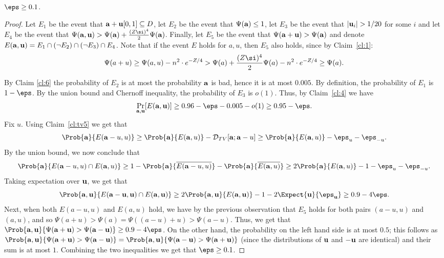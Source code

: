 \begin{claim}
	\label{cl:5}
	$\eps\geq 0.1$.
\end{claim}
\begin{proof}
	Let $E_1$ be the event that ${\bf a} + {\bf u}[0,1]\subseteq D$, let
    $E_2$ be the event that $\Psi({\bf a})\leq 1$, let $E_3$ be the event
	that $|{\bf u}_i|>1/20$ for some $i$ and let $E_4$ be the event that
	$\Psi({\bf a},{\bf u})>\Psi({\bf a})+\frac{(Z\si)^4}{2}\Psi({\bf a})$. Finally, let $E_5$ be the event that
	$\Psi({\bf a}+{\bf u})>\Psi({\bf a})$ and denote $E({\bf a},{\bf u}) = E_1\cap (\neg E_2)\cap (\neg E_3)\cap E_4$.
    Note that if the event $E$ holds for $a,u$, then $E_5$ also holds, since by Claim~\ref{cl:1}:
	\[
	\Psi(a+u)\geq \Psi(a,u)-n^2\cdot e^{-Z/4}> \Psi(a)+\frac{(Z\si)^4}{2}\Psi(a)-n^2\cdot e^{-Z/4}\geq \Psi(a).
	\]



    By Claim \ref{cl:6} the probability of $E_2$ is at most the probability ${\bf a}$ is bad, hence it is at most $0.005$.
    By definition, the probability of $E_1$ is $1-\eps$.
    By the union bound and Chernoff inequality, the probability of $E_3$ is $o(1)$.
	Thus, by Claim~\ref{cl:4} we have
	\begin{equation}
	\Pr_{{\bf a},{\bf u}}[E({\bf a},{\bf u})]\geq 0.96 -\eps- 0.005 - o(1)\geq 0.95-\eps.
	\end{equation}
    Fix $u$. Using Claim~\ref{cl:tv5} we get that
    \[
    \Prob{{\bf a}}{E({\bf a}-u,u)} \geq
    \Prob{{\bf a}}{E({\bf a},u)} - \mathcal{D}_{TV}[{\bf a}; {\bf a}-u]
    \geq \Prob{{\bf a}}{E({\bf a},u)} - \eps_u-\eps_{-u}.
    \]
    By the union bound, we now conclude that
    \[
    \Prob{{\bf a}}{E({\bf a}-u,u)\cap E({\bf a},u)}\geq
    1 -  \Prob{{\bf a}}{\overline{E({\bf a}-u,u)}}
    -  \Prob{{\bf a}}{\overline{E({\bf a},u)}}
    \geq 2 \Prob{{\bf a}}{E({\bf a},u)} -1-\eps_u-\eps_{-u}.
    \]
    Taking expectation over ${\bf u}$, we get that
    \[
      \Prob{{\bf a},{\bf u}}{E({\bf a}-{\bf u},{\bf u})\cap E({\bf a},{\bf u})}\geq
     2\Prob{{\bf a},{\bf u}}{E({\bf a},{\bf u})} -1-2\Expect{{\bf u}}{\eps_{\bf u}}
     \geq 0.9 - 4\eps.
    \]
    Next, when both $E(a-u,u)$ and $E(a,u)$ hold, we have by the previous observation that $E_5$ holds for both pairs $(a-u,u)$ and $(a,u)$,
    and so $\Psi(a+u) > \Psi (a) = \Psi((a-u) + u) > \Psi(a-u)$. Thus, we get that
    $\Prob{{\bf a},{\bf u}}{\Psi({\bf a}+{\bf u}) > \Psi({\bf a}-{\bf u})}\geq 0.9 - 4\eps$. On the other hand, the probability on the left hand side is at most $0.5$;
    this follows as
    $\Prob{{\bf a},{\bf u}}{\Psi({\bf a}+{\bf u}) > \Psi({\bf a}-{\bf u})}
    = \Prob{{\bf a},{\bf u}}{\Psi({\bf a}-{\bf u}) > \Psi({\bf a}+{\bf u})}$ (since the distributions of ${\bf u}$ and $-{\bf u}$ are identical) and their sum is at most $1$.
    Combining the two inequalities we get that $\eps \geq 0.1$.
\end{proof}


